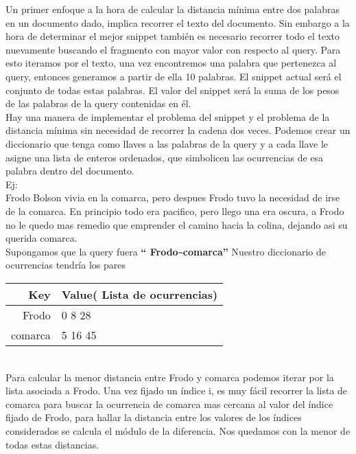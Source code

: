 \documentclass[12pt]{article}
\begin{document}
Un primer enfoque a la hora de calcular la distancia m\'inima entre dos palabras en un documento dado, implica recorrer el texto del documento. 
Sin embargo a la hora de determinar el mejor snippet tambi\'en es necesario recorrer todo el texto nuevamente buscando el fragmento con mayor valor con respecto al query.  Para esto iteramos por el texto, una vez encontremos una palabra que pertenezca al query, entonces generamos a partir de ella 10 palabras. El snippet actual ser\'a el conjunto de todas estas palabras. El valor del snippet ser\'a la suma de los pesos de las palabras de la query contenidas en \'el.\\

Hay una manera de implementar el problema del snippet y el problema de la distancia m\'inima sin necesidad de recorrer la cadena dos veces. Podemos crear un diccionario que tenga como llaves a las palabras de la query y a cada llave le asigne una lista de enteros ordenados, que simbolicen las ocurrencias de esa palabra dentro del documento.\\

Ej: \\
Frodo Bolson vivia en la comarca, pero despues Frodo tuvo la necesidad de irse de la comarca. En principio todo era pacifico, pero llego una era oscura, a Frodo no le quedo mas remedio que emprender el camino hacia la colina, dejando asi su querida comarca. \\


Supongamos que la query fuera \textbf{“ Frodo}\verb|~|\textbf{comarca”}
Nuestro diccionario de ocurrencias tendr\'ia los pares 

\begin{tabular}{|r|l|}
 \hline
 Key     &   Value( Lista de ocurrencias)  \\
 \hline 
Frodo   &      0   8   28   \\
comarca  &    5   16   45  \\
\hline
\end{tabular} \\


Para calcular la menor distancia entre Frodo y comarca podemos iterar por la lista asociada a Frodo. Una vez fijado un \'indice i, es muy f\'acil recorrer la lista de comarca para buscar la ocurrencia de comarca mas cercana al valor del \'indice fijado de Frodo, para hallar la distancia entre los valores de los \'indices considerados se calcula el m\'odulo de la diferencia. Nos quedamos con la menor de todas estas distancias.\\
\end{document}
